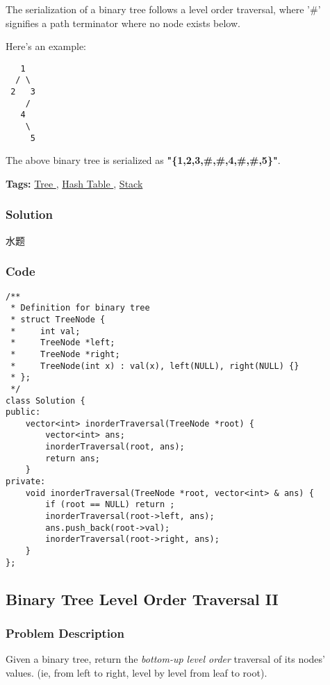 \documentclass{article}
\begin{document}
\begin{CJK*}{UTF8}{gkai}
The serialization of a binary tree follows a level order traversal, where '\#' signifies a path terminator where no node exists below.

Here's an example:


\begin{verbatim}
   1
  / \
 2   3
    /
   4
    \
     5
\end{verbatim}
The above binary tree is serialized as \textbf{"\{1,2,3,\#,\#,4,\#,\#,5\}"}.


\textbf{Tags: }
\hyperref[ Tree ]{ Tree },  \hyperref[ Hash Table ]{ Hash Table },  \hyperref[ Stack ]{ Stack }



\subsubsection*{Solution}
水题

\subsubsection*{Code}
\begin{lstlisting}
/**
 * Definition for binary tree
 * struct TreeNode {
 *     int val;
 *     TreeNode *left;
 *     TreeNode *right;
 *     TreeNode(int x) : val(x), left(NULL), right(NULL) {}
 * };
 */
class Solution {
public:
    vector<int> inorderTraversal(TreeNode *root) {
        vector<int> ans;
        inorderTraversal(root, ans);
        return ans;
    }
private:
    void inorderTraversal(TreeNode *root, vector<int> & ans) {
        if (root == NULL) return ;
        inorderTraversal(root->left, ans);
        ans.push_back(root->val);
        inorderTraversal(root->right, ans);
    }
}; 
\end{lstlisting}


\subsection{ Binary Tree Level Order Traversal II }
\label{ Binary Tree Level Order Traversal II }

\subsubsection*{Problem Description}
Given a binary tree, return the \emph{bottom-up level order} traversal of its nodes' values. (ie, from left to right, level by level from leaf to root).


\end{CJK*}
\end{document}
